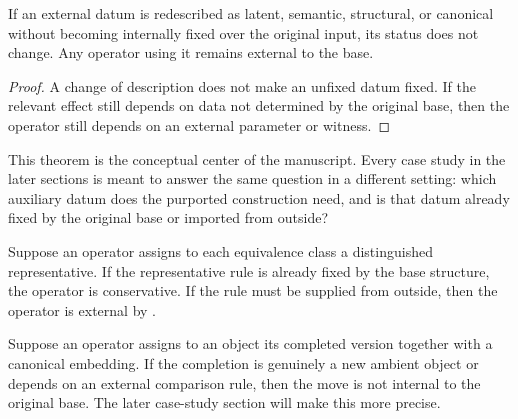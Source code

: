 \begin{corollary}\label{cor:no-internalization-by-relabeling}
If an external datum is redescribed as latent, semantic, structural, or canonical without becoming internally fixed over the original input, its status does not change. Any operator using it remains external to the base.
\end{corollary}

\begin{proof}
A change of description does not make an unfixed datum fixed. If the relevant effect still depends on data not determined by the original base, then the operator still depends on an external parameter or witness.
\end{proof}

\begin{remark}
This theorem is the conceptual center of the manuscript. Every case study in the later sections is meant to answer the same question in a different setting: which auxiliary datum does the purported construction need, and is that datum already fixed by the original base or imported from outside?
\end{remark}

\begin{example}[Canonicalization]
Suppose an operator assigns to each equivalence class a distinguished representative. If the representative rule is already fixed by the base structure, the operator is conservative. If the rule must be supplied from outside, then the operator is external by .
\end{example}

\begin{example}[Completion]
Suppose an operator assigns to an object its completed version together with a canonical embedding. If the completion is genuinely a new ambient object or depends on an external comparison rule, then the move is not internal to the original base. The later case-study section will make this more precise.
\end{example}
